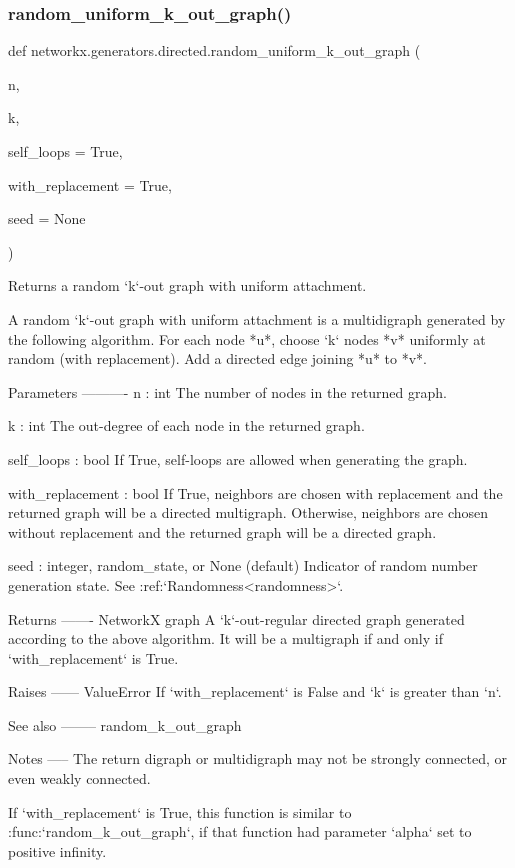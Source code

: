 \subsubsection{\texorpdfstring{random\+\_\+uniform\+\_\+k\+\_\+out\+\_\+graph()}{random\_uniform\_k\_out\_graph()}}
{\footnotesize\ttfamily def networkx.\+generators.\+directed.\+random\+\_\+uniform\+\_\+k\+\_\+out\+\_\+graph (\begin{DoxyParamCaption}\item[{}]{n,  }\item[{}]{k,  }\item[{}]{self\+\_\+loops = {\ttfamily True},  }\item[{}]{with\+\_\+replacement = {\ttfamily True},  }\item[{}]{seed = {\ttfamily None} }\end{DoxyParamCaption})}

\begin{DoxyVerb}Returns a random `k`-out graph with uniform attachment.

A random `k`-out graph with uniform attachment is a multidigraph
generated by the following algorithm. For each node *u*, choose
`k` nodes *v* uniformly at random (with replacement). Add a
directed edge joining *u* to *v*.

Parameters
----------
n : int
    The number of nodes in the returned graph.

k : int
    The out-degree of each node in the returned graph.

self_loops : bool
    If True, self-loops are allowed when generating the graph.

with_replacement : bool
    If True, neighbors are chosen with replacement and the
    returned graph will be a directed multigraph. Otherwise,
    neighbors are chosen without replacement and the returned graph
    will be a directed graph.

seed : integer, random_state, or None (default)
    Indicator of random number generation state.
    See :ref:`Randomness<randomness>`.

Returns
-------
NetworkX graph
    A `k`-out-regular directed graph generated according to the
    above algorithm. It will be a multigraph if and only if
    `with_replacement` is True.

Raises
------
ValueError
    If `with_replacement` is False and `k` is greater than
    `n`.

See also
--------
random_k_out_graph

Notes
-----
The return digraph or multidigraph may not be strongly connected, or
even weakly connected.

If `with_replacement` is True, this function is similar to
:func:`random_k_out_graph`, if that function had parameter `alpha`
set to positive infinity.\end{DoxyVerb}
 \mbox{\label{namespacenetworkx_1_1generators_1_1directed_aec6f28e2d6c0aa0a6ac5cfa0f339b231}} 
